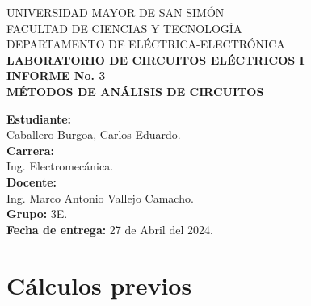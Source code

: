 \documentclass[letter,11pt]{article}
\begin{document}
\begin{titlepage}
    \begin{center}
        {\Large UNIVERSIDAD MAYOR DE SAN SIMÓN}\\
        \vspace*{0.15cm}
        {\large FACULTAD DE CIENCIAS Y TECNOLOGÍA}\\
        \vspace*{0.10cm}
        DEPARTAMENTO DE ELÉCTRICA-ELECTRÓNICA\\
        \vspace*{3.0cm}
        {\Large \textbf{LABORATORIO DE CIRCUITOS ELÉCTRICOS I}}\\
        \vspace*{0.3cm}
        {\Large \textbf{INFORME No. 3}}\\
        \vspace*{3.5cm}
        {\Large \textbf{MÉTODOS DE ANÁLISIS DE CIRCUITOS}}\\
    \end{center}

    \vspace*{6.4cm}
    \leftskip=7.95cm
    \noindent
    \textbf{Estudiante:}\\
    Caballero Burgoa, Carlos Eduardo.\\
    \newline
    \textbf{Carrera:}\\
    Ing. Electromecánica.\\
    \newline
    \textbf{Docente:}\\
    Ing. Marco Antonio Vallejo Camacho.\\
    \newline
    \textbf{Grupo:} 3E.\\
    \textbf{Fecha de entrega:} 27 de Abril del 2024.\\
\end{titlepage}

\section{Cálculos previos}
\end{document}
